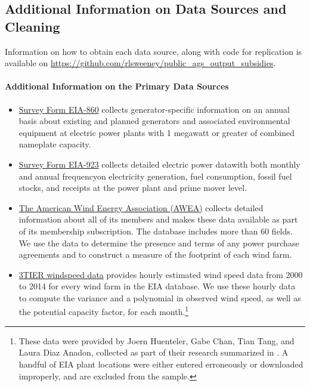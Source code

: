 \documentclass[12pt]{article}
\begin{document}
\subsection{Additional Information on Data Sources and Cleaning}

Information on how to obtain each data source, along with code for replication is available on \href{https://github.com/rlsweeney/public_ags_output_subsidies}{https://github.com/rlsweeney/public\_ags\_output\_subsidies}. 

\paragraph{Additional Information on the Primary Data Sources }
\begin{itemize}
\item \href{https://www.eia.gov/electricity/data/eia860/}{Survey Form EIA-860} collects generator-specific information on an annual basis about existing and planned generators and associated environmental equipment at electric power plants with 1 megawatt or greater of combined nameplate capacity.
\item \href{https://www.eia.gov/electricity/data/eia923/}{Survey Form EIA-923} collects detailed electric power data\textemdash with both monthly and annual frequency\textemdash on electricity generation, fuel consumption, fossil fuel stocks, and receipts at the power plant and prime mover level.
\item \href{https://www.awea.org/windiq}{The American Wind Energy Association (AWEA)} collects detailed information about all of its members and makes these data available as part of its membership subscription. The database includes more than 60 fields. We use the data to determine the presence and terms of any power purchase agreements and to construct a measure of the footprint of each wind farm.
\item \href{https://www.vaisala.com/en/industries-innovation/renewable-energy-and-weather}{3TIER windspeed data} provides hourly estimated wind speed data from 2000 to 2014 for every wind farm in the EIA database. We use these hourly data to compute the variance and a polynomial in observed wind speed, as well as the potential capacity factor, for each month.\footnote{These data were provided by Joern Huenteler, Gabe Chan, Tian Tang, and Laura Diaz Anadon, collected as part of their research summarized in \citet{huenteler_why_2018}. A handful of EIA plant locations were either entered erroneously or downloaded improperly, and are excluded from the sample.}

\end{itemize}
\end{document}

